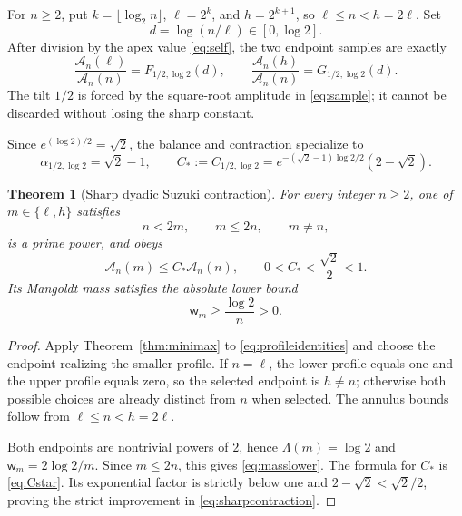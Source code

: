 \documentclass[11pt]{article}
\newtheorem{theorem}{Theorem}[section]
\newcommand{\Lam}{\Lambda}
\newcommand{\A}{\mathcal A}
\newcommand{\w}{\mathsf w}
\begin{document}
For $n\ge2$, put $k=\lfloor\log_2n\rfloor$, $\ell=2^k$, and $h=2^{k+1}$, so
$\ell\le n<h=2\ell$.  Set
\[
 d=\log(n/\ell)\in[0,\log2].
\]
After division by the apex value \eqref{eq:self}, the two endpoint samples are exactly
\begin{equation}\label{eq:profileidentities}
 \frac{\A_n(\ell)}{\A_n(n)}=F_{1/2,\log2}(d),\qquad
 \frac{\A_n(h)}{\A_n(n)}=G_{1/2,\log2}(d).
\end{equation}
The tilt $1/2$ is forced by the square-root amplitude in \eqref{eq:sample}; it cannot be discarded
without losing the sharp constant.

Since $e^{(\log2)/2}=\sqrt2$, the balance and contraction specialize to
\begin{equation}\label{eq:Cstar}
 \alpha_{1/2,\log2}=\sqrt2-1,
 \qquad
 C_*:=C_{1/2,\log2}
 =e^{-(\sqrt2-1)\log2/2}(2-\sqrt2).
\end{equation}

\begin{theorem}[Sharp dyadic Suzuki contraction]\label{thm:contraction}
For every integer $n\ge2$, one of $m\in\{\ell,h\}$ satisfies
\begin{equation}\label{eq:dyadicgeometry}
 n<2m,\qquad m\le2n,\qquad m\ne n,
\end{equation}
is a prime power, and obeys
\begin{equation}\label{eq:sharpcontraction}
 \A_n(m)\le C_*\A_n(n),
 \qquad
 0<C_*<\frac{\sqrt2}{2}<1.
\end{equation}
Its Mangoldt mass satisfies the absolute lower bound
\begin{equation}\label{eq:masslower}
 \w_m\ge\frac{\log2}{n}>0.
\end{equation}
\end{theorem}

\begin{proof}
Apply Theorem~\ref{thm:minimax} to \eqref{eq:profileidentities} and choose the endpoint realizing
the smaller profile.  If $n=\ell$, the lower profile equals one and the upper profile equals zero,
so the selected endpoint is $h\ne n$; otherwise both possible choices are already distinct from
$n$ when selected.  The annulus bounds follow from $\ell\le n<h=2\ell$.

Both endpoints are nontrivial powers of $2$, hence $\Lam(m)=\log2$ and
$\w_m=2\log2/m$.  Since $m\le2n$, this gives \eqref{eq:masslower}.  The formula for $C_*$ is
\eqref{eq:Cstar}.  Its exponential factor is strictly below one and
$2-\sqrt2<\sqrt2/2$, proving the strict improvement in \eqref{eq:sharpcontraction}.
\end{proof}
\end{document}
